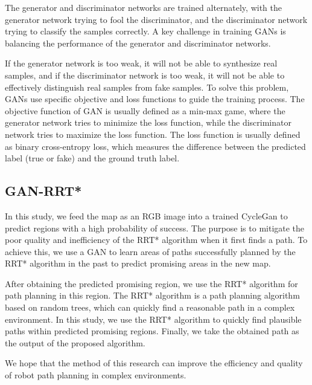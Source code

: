 \documentclass[smallcondensed]{svjour3}     %
\begin{document}
The generator and discriminator networks are trained alternately, with the generator network trying to fool the discriminator, and the discriminator network trying to classify the samples correctly.
A key challenge in training GANs is balancing the performance of the generator and discriminator networks. 

If the generator network is too weak, it will not be able to synthesize real samples, and if the discriminator network is too weak, it will not be able to effectively distinguish real samples from fake samples. 
To solve this problem, GANs use specific objective and loss functions to guide the training process.
The objective function of GAN is usually defined as a min-max game, where the generator network tries to minimize the loss function, while the discriminator network tries to maximize the loss function.
The loss function is usually defined as binary cross-entropy loss, which measures the difference between the predicted label (true or fake) and the ground truth label.


\subsection{GAN-RRT*}
In this study, we feed the map as an RGB image into a trained CycleGan to predict regions with a high probability of success. 
The purpose is to mitigate the poor quality and inefficiency of the RRT* algorithm when it first finds a path. 
To achieve this, we use a GAN to learn areas of paths successfully planned by the RRT* algorithm in the past to predict promising areas in the new map.

After obtaining the predicted promising region, we use the RRT* algorithm for path planning in this region.
The RRT* algorithm is a path planning algorithm based on random trees, which can quickly find a reasonable path in a complex environment. 
In this study, we use the RRT* algorithm to quickly find plausible paths within predicted promising regions. 
Finally, we take the obtained path as the output of the proposed algorithm.

We hope that the method of this research can improve the efficiency and quality of robot path planning in complex environments.
\end{document}
